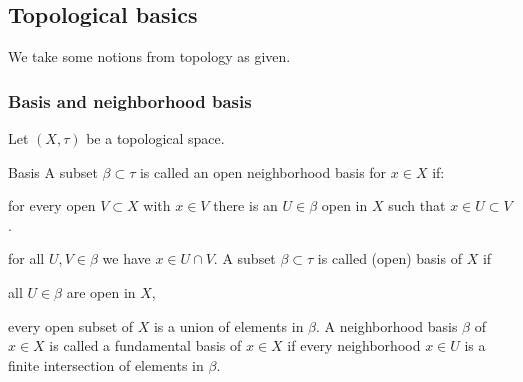 \subsection{Topological basics}
We take some notions from topology as given.
\subsubsection{Basis and neighborhood basis}
\begin{defi}
Let $(X, \tau)$ be a topological space.
\bd
\item[Basis] A subset $\beta \subset \tau$ is called an open neighborhood basis for $x \in X$ if:%
\bn
\item for every open $V \subset X$ with $x \in V$ there is an $U \in \beta$ open in $X$ such that $x \in U \subset V$.%
\item for all $U, V \in \beta$ we have $x \in U \cap V$.%
\en
A subset $\beta \subset \tau$ is called (open) basis of $X$ if
\bn
\item all $U \in \beta$ are open in $X$,
\item every open subset of $X$ is a union of elements in $\beta$.%
\en
\ed
A neighborhood basis $\beta$ of $x \in X$ is called a fundamental basis of $x \in X$ if every neighborhood $x \in U$ is a finite intersection of elements in $\beta$.%
\end{defi}
